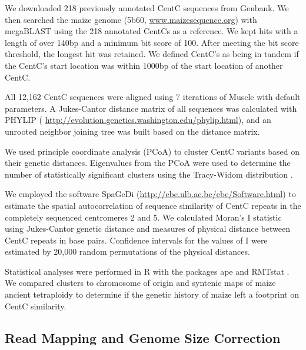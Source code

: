 We downloaded 218 previously annotated CentC sequences \citep{Ananiev1998B, Nagaki2003} from Genbank.  We then searched the maize genome (5b60, \url{www.maizesequence.org}) with megaBLAST \citep{McGinnis2004} using the 218 annotated CentCs as a reference.  We kept hits with a length of over 140bp and a minimum bit score of 100.  After meeting the bit score threshold, the longest hit was retained.  We defined CentC’s as being in tandem if the CentC’s start location was within 1000bp of the start location of another CentC.
	
All 12,162 CentC sequences were aligned using 7 iterations of Muscle \citep{Edgar2004} with default parameters.  A Jukes-Cantor distance matrix of all sequences was calculated with PHYLIP (\citep{Felsenstein1989} \url{http://evolution.genetics.washington.edu/phylip.html}), and an unrooted neighbor joining tree was built based on the distance matrix.  
	
We used principle coordinate analysis (PCoA) to cluster CentC variants based on their genetic distances. Eigenvalues from the PCoA were used to determine the number of statistically significant clusters using the Tracy-Widom distribution \citep{Patterson2006}.  
	
We employed the software SpaGeDi (\citep{Hardy2002}\url{http://ebe.ulb.ac.be/ebe/Software.html}) to estimate the spatial autocorrelation of sequence similarity of CentC repeats in the completely sequenced centromeres 2 and 5.  We calculated Moran’s I statistic using Jukes-Cantor genetic distance and measures of physical distance between CentC repeats in base pairs.  Confidence intervals for the values of I were estimated by 20,000 random permutations of the physical distances.  
	
Statistical analyses were performed in R with the packages ape \citep{Paradis2004} and RMTstat \citep{Perry2009}.  We compared clusters to chromosome of origin and syntenic maps of maize ancient tetraploidy \citep{Schnable2011} to determine if the genetic history of maize left a footprint on CentC similarity.

\subsection*{Read Mapping and Genome Size Correction}
	
